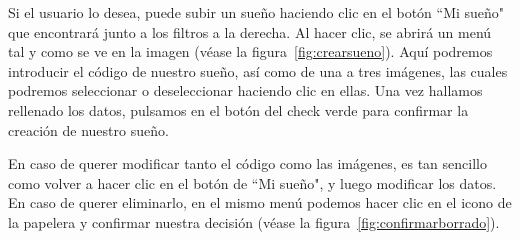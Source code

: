 \clearpage

Si el usuario lo desea, puede subir un sueño haciendo clic en el botón ``Mi sueño" que encontrará junto a los filtros a la derecha. Al hacer clic, se abrirá un menú tal y como se ve en la imagen {(v\'ease la figura~\ref{fig:crearsueno})}. Aquí podremos introducir el código de nuestro sueño, así como de una a tres imágenes, las cuales podremos seleccionar o deseleccionar haciendo clic en ellas. Una vez hallamos rellenado los datos, pulsamos en el botón del check verde para confirmar la creación de nuestro sueño.\\


En caso de querer modificar tanto el código como las imágenes, es tan sencillo como volver a hacer clic en el botón de ``Mi sueño", y luego modificar los datos. En caso de querer eliminarlo, en el mismo menú podemos hacer clic en el icono de la papelera y confirmar nuestra decisión {(v\'ease la figura~\ref{fig:confirmarborrado})}.\\

